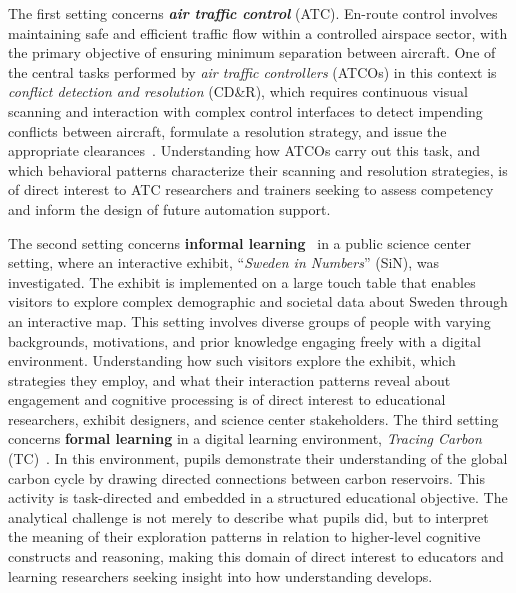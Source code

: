 The first setting concerns \textbf{\textit{air traffic control}} (ATC).
En-route control involves maintaining safe and efficient traffic flow within a controlled airspace sector, with the primary objective of ensuring minimum separation between aircraft.
One of the central tasks performed by \textit{air traffic controllers} (ATCOs) in this context is \textit{conflict detection and resolution} (CD\&R), which requires continuous visual scanning and interaction with complex control interfaces to detect impending conflicts between aircraft, formulate a resolution strategy, and issue the appropriate clearances~\cite{lundberg2015situation}.
Understanding how ATCOs carry out this task, and which behavioral patterns characterize their scanning and resolution strategies, is of direct interest to ATC researchers and trainers seeking to assess competency and inform the design of future automation support.

The second setting concerns \textbf{informal learning}~\cite{andre2017museums} in a public science center setting, where an interactive exhibit, ``\textit{Sweden in Numbers}'' (SiN), was investigated.
The exhibit is implemented on a large touch table that enables visitors to explore complex demographic and societal data about Sweden through an interactive map.
This setting involves diverse groups of people with varying backgrounds, motivations, and prior knowledge engaging freely with a digital environment.
Understanding how such visitors explore the exhibit, which strategies they employ, and what their interaction patterns reveal about engagement and cognitive processing is of direct interest to educational researchers, exhibit designers, and science center stakeholders.
The third setting concerns \textbf{formal learning} in a digital learning environment, \textit{Tracing Carbon} (TC)~\cite{mani2026designing}.
In this environment, pupils demonstrate their understanding of the global carbon cycle by drawing directed connections between carbon reservoirs.
This activity is task-directed and embedded in a structured educational objective.
The analytical challenge is not merely to describe what pupils did, but to interpret the meaning of their exploration patterns in relation to higher-level cognitive constructs and reasoning, making this domain of direct interest to educators and learning researchers seeking insight into how understanding develops.






